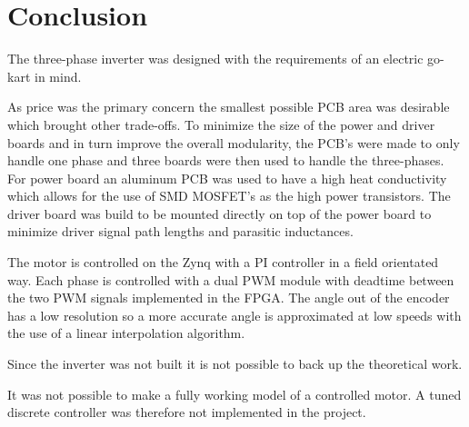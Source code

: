 \section{Conclusion}
\label{sec:conclusion}



The three-phase inverter was designed with the requirements of an electric go-kart in mind. 

As price was the primary concern the smallest possible PCB area was desirable which brought other trade-offs. 
To minimize the size of the power and driver boards and in turn improve the overall modularity, the PCB's were made to only handle one phase and three boards were then used to handle the three-phases.
For power board an aluminum PCB was used to have a high heat conductivity which allows for the use of SMD MOSFET's as the high power transistors. The driver board was build to be mounted directly on top of the power board to minimize driver signal path lengths and parasitic inductances.

The motor is controlled on the Zynq with a PI controller in a field orientated way. Each phase is controlled with a dual PWM module with deadtime between the two PWM signals implemented in the FPGA.
The angle out of the encoder has a low resolution so a more accurate angle is approximated at low speeds with the use of a linear interpolation algorithm. 

Since the inverter was not built it is not possible to back up the theoretical work.

It was not possible to make a fully working model of a controlled motor. A tuned discrete controller was therefore not implemented in the project.

